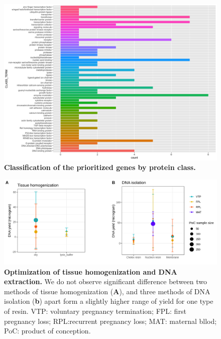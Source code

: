 \begin{figure}[ht]
    \centering
    \includegraphics[width= 14 cm, high= 16cm]{fig/class_term_grep.png}
    \caption{\textbf{Classification of the prioritized genes by protein class. }}
    \label{fig:protClass}
\end{figure}


\begin{figure}[ht]
    \centering
    \includegraphics[width= 14 cm, high= 16cm]{fig/panelDNA.png}
    \caption{\textbf{Optimization of tissue homogenization and DNA extraction.} We do not observe significant difference between two methods of tissue homogenization (\textbf{A}), and three methods of DNA isolation (\textbf{b}) apart form a slightly higher range of yield for one type of resin. VTP: voluntary pregnancy termination;  FPL: first pregnancy loss; RPL:recurrent pregnancy loss;  MAT: maternal bllod; PoC: product of conception.}
    \label{fig:dna}
\end{figure}

